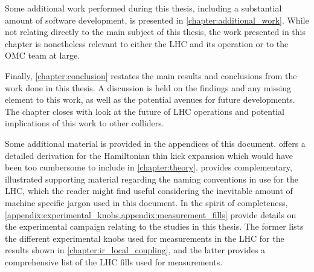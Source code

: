 Some additional work performed during this thesis, including a substantial amount of software development, is presented in \cref{chapter:additional_work}.
While not relating directly to the main subject of this thesis, the work presented in this chapter is nonetheless relevant to either the \acrshort{LHC} and its operation or to the \acrshort{OMC} team at large.

Finally, \cref{chapter:conclusion} restates the main results and conclusions from the work done in this thesis.
A discussion is held on the findings and any missing element to this work, as well as the potential avenues for future developments.
The chapter closes with look at the future of LHC operations and potential implications of this work to other colliders.

Some additional material is provided in the appendices of this document.
 offers a detailed derivation for the Hamiltonian thin kick expansion which would have been too cumbersome to include in \cref{chapter:theory}.
 provides complementary, illustrated supporting material regarding the naming conventions in use for the \acrshort{LHC}, which the reader might find useful considering the inevitable amount of machine specific jargon used in this document.
In the spirit of completeness, \cref{appendix:experimental_knobs,appendix:measurement_fills} provide details on the experimental campaign relating to the studies in this thesis.
The former lists the different experimental knobs used for measurements in the LHC for the results shown in \cref{chapter:ir_local_coupling}, and the latter provides a comprehensive list of the LHC fills used for measurements.


